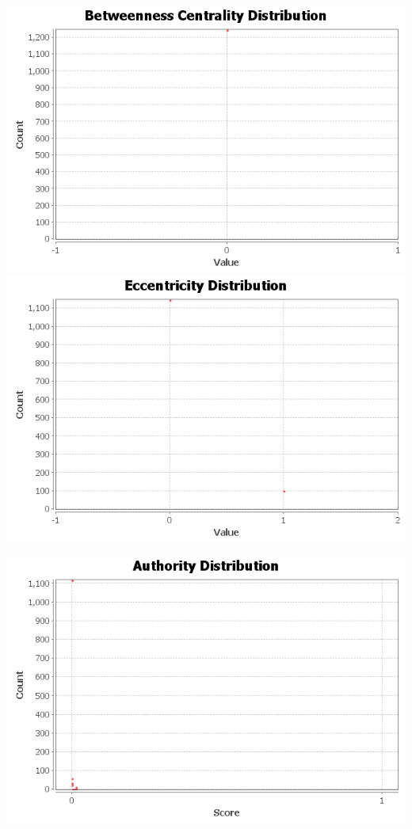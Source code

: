 \documentclass{article}
\begin{document}
\includegraphics[scale=.5]{BetweennessCentralityDistribution.png} \\
\includegraphics[scale=.5]{EccentricityDistribution.png} \\
\graphicspath{{q3/hits/}}
\includegraphics[scale=.5]{authorities.png} \\
\end{document}
